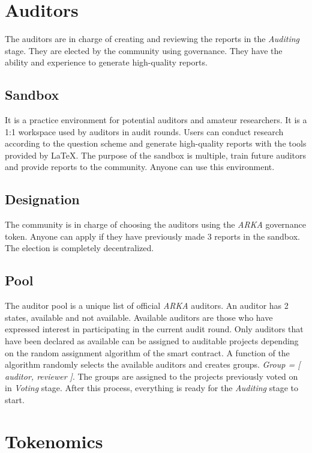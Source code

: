 \documentclass[12pt]{article}
\begin{document}
\section{ Auditors }

The auditors are in charge of creating and reviewing the reports in the \emph{Auditing} stage. They are elected by the community using governance. They have the ability and experience to generate high-quality reports.

\subsection { Sandbox }

It is a practice environment for potential auditors and amateur researchers. It is a 1:1 workspace used by auditors in audit rounds. Users can conduct research according to the question scheme and generate high-quality reports with the tools provided by LaTeX. The purpose of the sandbox is multiple, train future auditors and provide reports to the community. Anyone can use this environment.


\subsection { Designation }

The community is in charge of choosing the auditors using the \emph{ARKA} governance token. Anyone can apply if they have previously made 3 reports in the sandbox. The election is completely decentralized.
 

\subsection { Pool }

The auditor pool is a unique list of official \emph{ARKA} auditors. An auditor has 2 states, available and not available. Available auditors are those who have expressed interest in participating in the current audit round. Only auditors that have been declared as available can be assigned to auditable projects depending on the random assignment algorithm of the smart contract. A function of the algorithm randomly selects the available auditors and creates groups. \emph{Group = [ auditor, reviewer ]}. The groups are assigned to the projects previously voted on in \emph{Voting} stage. After this process, everything is ready for the \emph{Auditing} stage to start. 


\section { Tokenomics }
\end{document}
